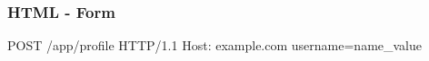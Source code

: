 \begin{frame}[fragile]
 	\frametitle{HTML - Form}
   
   \footnotesize
   POST /app/profile HTTP/1.1 \newline
   Host: example.com \newline
   \newline
   username=name\_value
\end{frame}